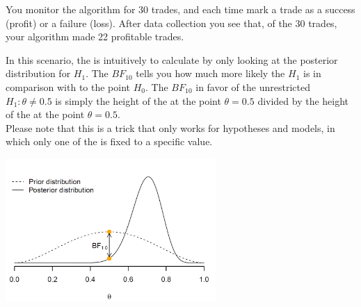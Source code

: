 

You monitor the algorithm for 30 trades, and each time mark a trade as a success (profit) or a failure (loss). After data collection you see that, of the 30 trades, your algorithm made 22 profitable trades. \\


\emptyanswerbox{
    $\alpha$: \shortanswerline \hspace*{3cm} $\beta$: \shortanswerline
}

\clearpage %



\rcodeanswertiny

In this scenario, the  is intuitively to calculate by only looking at the posterior distribution for $H_1$. The  $BF_{10}$ tells you how much more likely the  $H_1$ is in comparison with to the point  $H_0$. The  $BF_{10}$ in favor of the unrestricted  $H_1: \theta \neq 0.5$ is simply the height of the  at the point $\theta = 0.5$ divided by the height of the  at the point $\theta = 0.5$. \\

Please note that this is a trick that only works for  hypotheses and models, in which only one of the  is fixed to a specific value. \\

\begin{center}
    \includegraphics[width=0.6\textwidth]{Files/Images/priorAndPosterior.pdf}
\end{center}

